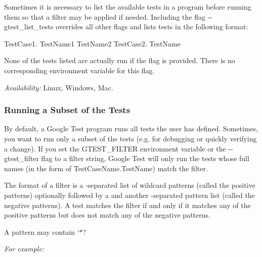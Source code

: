 Sometimes it is necessary to list the available tests in a program before running them so that a filter may be applied if needed. Including the flag {\ttfamily -\/-\/gtest\+\_\+list\+\_\+tests} overrides all other flags and lists tests in the following format\+: 
\begin{DoxyCode}
TestCase1.
  TestName1
  TestName2
TestCase2.
  TestName
\end{DoxyCode}


None of the tests listed are actually run if the flag is provided. There is no corresponding environment variable for this flag.

{\itshape Availability\+:} Linux, Windows, Mac.

\subsubsection*{Running a Subset of the Tests}

By default, a Google Test program runs all tests the user has defined. Sometimes, you want to run only a subset of the tests (e.\+g. for debugging or quickly verifying a change). If you set the {\ttfamily G\+T\+E\+S\+T\+\_\+\+F\+I\+L\+T\+ER} environment variable or the {\ttfamily -\/-\/gtest\+\_\+filter} flag to a filter string, Google Test will only run the tests whose full names (in the form of {\ttfamily Test\+Case\+Name.\+Test\+Name}) match the filter.

The format of a filter is a \textquotesingle{}{\ttfamily \+:}\textquotesingle{}-\/separated list of wildcard patterns (called the positive patterns) optionally followed by a \textquotesingle{}{\ttfamily -\/}\textquotesingle{} and another \textquotesingle{}{\ttfamily \+:}\textquotesingle{}-\/separated pattern list (called the negative patterns). A test matches the filter if and only if it matches any of the positive patterns but does not match any of the negative patterns.

A pattern may contain `\textquotesingle{}$\ast$\textquotesingle{}?

{\itshape For example\+:}

